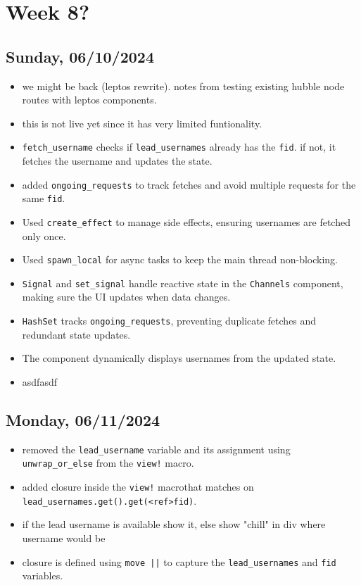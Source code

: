 \newpage
\section{Week 8?}
\subsection*{Sunday, 06/10/2024}
\begin{itemize}
    \item we might be back (leptos rewrite). notes from testing existing hubble
        node routes with leptos components.
    \item this is not live yet since it has very limited funtionality.
    \item \texttt{fetch_username} checks if \texttt{lead_usernames} already 
        has the \texttt{fid}. if not, it fetches the username and updates the 
        state.
    \item added \texttt{ongoing_requests} to track fetches and avoid multiple 
        requests for the same \texttt{fid}.
    \item Used \texttt{create_effect} to manage side effects, ensuring 
        usernames are fetched only once.
    \item Used \texttt{spawn_local} for async tasks to keep the main thread 
        non-blocking.
    \item \texttt{Signal} and \texttt{set_signal} handle reactive state in the 
        \texttt{Channels} component, making sure the UI updates when data 
        changes.
    \item \texttt{HashSet} tracks \texttt{ongoing_requests}, preventing 
        duplicate fetches and redundant state updates.
    \item The component dynamically displays usernames from the updated state.
    \item asdfasdf
\end{itemize}

\subsection*{Monday, 06/11/2024}
\begin{itemize}
    \item removed the \texttt{lead_username} variable and its assignment using 
        \texttt{unwrap_or_else} from the \texttt{view!} macro.
    \item added closure inside the \texttt{view!} macrothat matches on 
        \texttt{lead_usernames.get().get(<ref>fid)}.
    \item if the lead username is available show it, else show "chill" in div
        where username would be 
    \item closure is defined using \texttt{move ||} to capture the 
        \texttt{lead_usernames} and \texttt{fid} variables.
\end{itemize}


